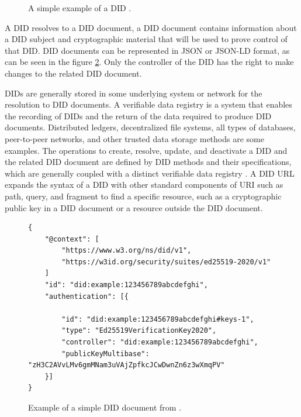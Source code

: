 \begin{figure}[h!]
    \centering
    
    \caption{A simple example of a DID \cite{didW3C}.}
    \label{didExample}
\end{figure}

A DID resolves to a DID document, a DID document contains information about a DID subject and cryptographic material that will be used to prove control of that DID. DID documents can be represented in JSON \cite{json-rfc3986} or JSON-LD \cite{json-ld} format, as can be seen in the figure \ref{didDocExample}. Only the controller of the DID has the right to make changes to the related DID document. 

DIDs are generally stored in some underlying system or network for the resolution to DID documents. A verifiable data registry is a system that enables the recording of DIDs and the return of the data required to produce DID documents. Distributed ledgers, decentralized file systems, all types of databases, peer-to-peer networks, and other trusted data storage methods are some examples. The operations to create, resolve, update, and deactivate a DID and the related DID document are defined by DID methods and their specifications, which are generally coupled with a distinct verifiable data registry \cite{didW3C}. 
A DID URL expands the syntax of a DID with other standard components of URI such as path, query, and fragment to find a specific resource, such as a cryptographic public key in a DID document or a resource outside the DID document. \\



\begin{figure}[h!]
\begin{lstlisting}[style=json,frame=single]
{
    "@context": [
        "https://www.w3.org/ns/did/v1",
        "https://w3id.org/security/suites/ed25519-2020/v1"
    ]
    "id": "did:example:123456789abcdefghi",
    "authentication": [{

        "id": "did:example:123456789abcdefghi#keys-1",
        "type": "Ed25519VerificationKey2020",
        "controller": "did:example:123456789abcdefghi",
        "publicKeyMultibase": "zH3C2AVvLMv6gmMNam3uVAjZpfkcJCwDwnZn6z3wXmqPV"
    }]
}
\end{lstlisting}
\caption{Example of a simple DID document from \cite{didW3C}. \label{didDocExample}}
\end{figure}

